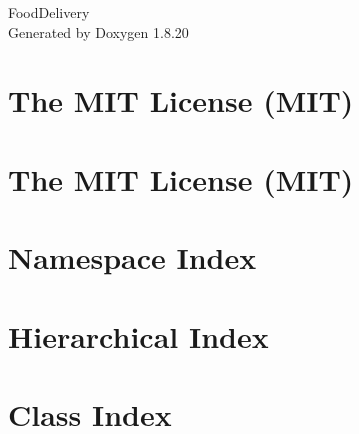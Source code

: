 \let\mypdfximage\pdfximage\def\pdfximage{\immediate\mypdfximage}\documentclass[twoside]{book}
\newcommand{\+}{\discretionary{\mbox{\scriptsize$\hookleftarrow$}}{}{}}
\newcommand{\clearemptydoublepage}{%
  \newpage{\pagestyle{empty}\cleardoublepage}%
}
\begin{document}
\hypersetup{pageanchor=false,
             bookmarksnumbered=true,
             pdfencoding=unicode
            }
\begin{titlepage}
\vspace*{7cm}
\begin{center}%
{\Large Food\+Delivery }\\
\vspace*{1cm}
{\large Generated by Doxygen 1.8.20}\\
\end{center}
\end{titlepage}
\clearemptydoublepage
{}
\tableofcontents
\clearemptydoublepage
{}
\hypersetup{pageanchor=true}

\chapter{The M\+IT License (M\+IT)}
\label{md__c___users__gradn__one_drive__c_s_4790__food_delivery__food_delivery_obj__release_netcoreapp3fb2722082162a479f033393082989e2c}

\chapter{The M\+IT License (M\+IT)}
\label{md__c___users__gradn__one_drive__c_s_4790__food_delivery__food_delivery_wwwroot_lib_jquery-validation__l_i_c_e_n_s_e}

\chapter{Namespace Index}

\chapter{Hierarchical Index}

\chapter{Class Index}

\end{document}
